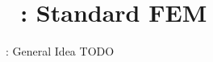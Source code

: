 \section{\appendixname~\theappendixframenumber~: Standard FEM}

\begin{frame}{\appendixname~\theappendixframenumber~: General Idea}
	TODO
\end{frame}
\addtocounter{appendixframenumber}{1}